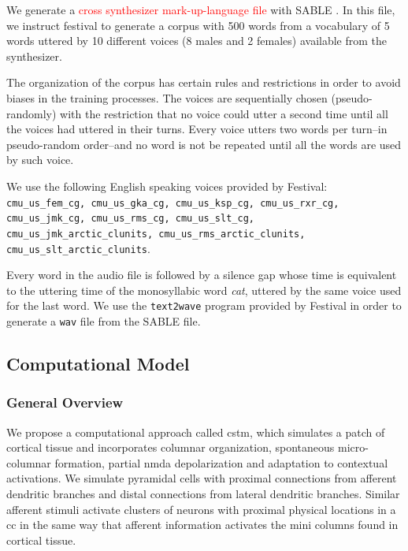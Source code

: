 \documentclass[10pt,letterpaper]{article}
\begin{document}

We generate a \textcolor{red}{cross synthesizer mark-up-language file} with SABLE \cite{sable}.
In this file, we instruct \gls{festival} to generate a corpus with 500 words from a vocabulary of
5 words uttered by 10 different voices (8 males and 2 females) available from the synthesizer.

The organization of the corpus has certain rules and restrictions in order to avoid biases in the training processes.
The voices are sequentially chosen (pseudo-randomly) with the restriction that no voice could utter a second time until all the voices had uttered in their turns. Every voice utters two words per turn--in pseudo-random order--and no word is not be repeated until all the words are used by such voice. 

We use the following English speaking voices provided by Festival: \texttt{cmu\_us\_fem\_cg, cmu\_us\_gka\_cg, cmu\_us\_ksp\_cg, cmu\_us\_rxr\_cg, cmu\_us\_jmk\_cg, cmu\_us\_rms\_cg, cmu\_us\_slt\_cg, cmu\_us\_jmk\_arctic\_clunits, cmu\_us\_rms\_arctic\_clunits, cmu\_us\_slt\_arctic\_clunits}.

Every word in the audio file is followed by a silence gap whose time is equivalent to the uttering time of the monosyllabic word \textit{cat}, uttered by the same voice used for the last word. We use the \texttt{text2wave} program provided by Festival in order to generate a \texttt{wav} file from the SABLE file.



\subsection*{Computational Model}

\subsubsection*{General Overview}

We propose a computational approach called \gls{cstm}, which simulates a patch of cortical tissue and incorporates columnar organization, spontaneous micro-columnar formation, partial \gls{nmda} depolarization and adaptation to contextual activations. We simulate pyramidal cells with proximal connections from afferent dendritic branches and distal connections from lateral dendritic branches. Similar afferent stimuli activate clusters of neurons with proximal physical locations in a \gls{cc} in the same way that afferent information activates the mini columns found in cortical tissue.
\end{document}

